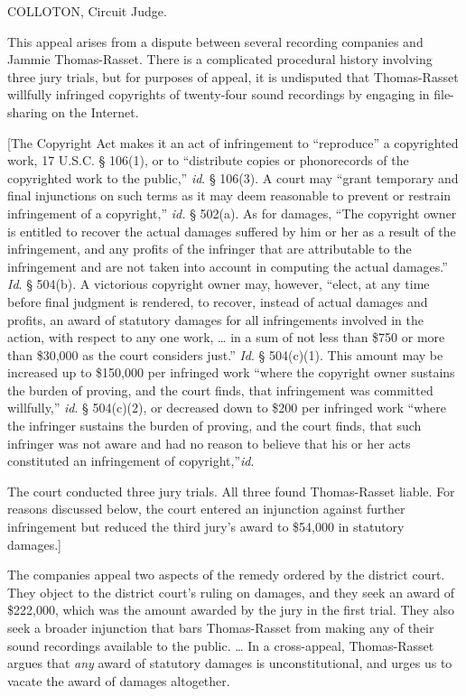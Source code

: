 
COLLOTON, Circuit Judge.

This appeal arises from a dispute between several recording companies and Jammie
Thomas-Rasset. There is a complicated procedural history involving three jury
trials, but for purposes of appeal, it is undisputed that Thomas-Rasset
willfully infringed copyrights of twenty-four sound recordings by engaging in
file-sharing on the Internet. 

[The Copyright Act makes it an act of infringement to ``reproduce'' a
copyrighted work, 17 U.S.C. {\S} 106(1), or to ``distribute copies or
phonorecords of the copyrighted work to the public,'' \textit{id}. {\S} 106(3).
A court may ``grant temporary and final injunctions on such terms as it may
deem reasonable to prevent or restrain infringement of a copyright,''
\textit{id.} {\S} 502(a). As for damages, ``The copyright owner is entitled to
recover the actual damages suffered by him or her as a result of the
infringement, and any profits of the infringer that are attributable to the
infringement and are not taken into account in computing the actual damages.''
\textit{Id}. {\S} 504(b). A victorious copyright owner may, however, ``elect,
at any time before final judgment is rendered, to recover, instead of actual
damages and profits, an award of statutory damages for all infringements
involved in the action, with respect to any one work, {\dots} in a sum of not
less than \$750 or more than \$30,000 as the court considers just.''
\textit{Id}. {\S} 504(c)(1). This amount may be increased up to \$150,000 per
infringed work ``where the copyright owner sustains the burden of proving, and
the court finds, that infringement was committed willfully,'' \textit{id}. {\S}
504(c)(2), or decreased down to \$200 per infringed work ``where the infringer
sustains the burden of proving, and the court finds, that such infringer was
not aware and had no reason to believe that his or her acts constituted an
infringement of copyright,''\textit{id}.

The court conducted three jury trials. All three found Thomas-Rasset liable. For
reasons discussed below, the court entered an injunction against further
infringement but reduced the third jury's award to \$54,000 in statutory
damages.]

The companies appeal two aspects of the remedy ordered by the district court.
They object to the district court's ruling on damages, and they seek an award
of \$222,000, which was the amount awarded by the jury in the first trial. They
also seek a broader injunction that bars Thomas-Rasset from making any of their
sound recordings available to the public. {\dots} In a cross-appeal,
Thomas-Rasset argues that \textit{any} award of statutory damages is
unconstitutional, and urges us to vacate the award of damages altogether.

